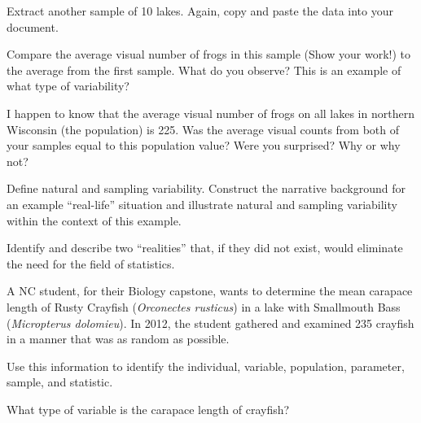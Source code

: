 \documentclass[10pt,openany]{book}\usepackage[]{graphicx}\usepackage[]{color}
\begin{document}
\begin{hwsection}
\begin{Enumerate}
      \item \rhw{} Extract another sample of 10 lakes.  Again, copy and paste the data into your document.
      \item Compare the average visual number of frogs in this sample (Show your work!) to the average from the first sample.  What do you observe?  This is an example of what type of variability?
      \item I happen to know that the average visual number of frogs on all lakes in northern Wisconsin (the population) is 225.  Was the average visual counts from both of your samples equal to this population value?  Were you surprised?  Why or why not?
    \end{Enumerate}

  \item \label{hwprob:WhyStatsVAR}Define natural and sampling variability.  Construct the narrative background for an example ``real-life'' situation and illustrate natural and sampling variability within the context of this example.

  \item \label{hwprob:WhyStatsReality}Identify and describe two ``realities'' that, if they did not exist, would eliminate the need for the field of statistics.

  \item \label{hwprob:IVPPSSCrayfish}A NC student, for their Biology capstone, wants to determine the mean carapace length of Rusty Crayfish (\textit{Orconectes rusticus}) in a lake with Smallmouth Bass (\textit{Micropterus dolomieu}). In 2012, the student gathered and examined 235 crayfish in a manner that was as random as possible.
    \begin{Enumerate}
      \item Use this information to identify the individual, variable, population, parameter, sample, and statistic.
      \item What type of variable is the carapace length of crayfish?
    \end{Enumerate}



\end{hwsection}
\end{document}
